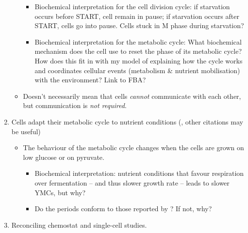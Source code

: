 \begin{enumerate}
\begin{itemize}
\begin{itemize}
\item Biochemical interpretation for the cell division cycle: if starvation occurs before START, cell remain in pause; if starvation occurs after START, cells go into pause.  Cells stuck in M phase during starvation?
\item Biochemical interpretation for the metabolic cycle: What biochemical mechanism does the cell use to reset the phase of its metabolic cycle?  How does this fit in with my model of explaining how the cycle works and coordinates cellular events (metabolism \& nutrient mobilisation) with the environment?  Link to FBA?
\end{itemize}
\item Doesn't necessarily mean that cells \emph{cannot} communicate with each other, but communication is \emph{not required}.
\end{itemize}
\item Cells adapt their metabolic cycle to nutrient conditions (\textcite{papagiannakisAutonomousMetabolicOscillations2017}, other citations may be useful)
\begin{itemize}
\item The behaviour of the metabolic cycle changes when the cells are grown on low glucose or on pyruvate.
\begin{itemize}
\item Biochemical interpretation: nutrient conditions that favour respiration over fermentation -- and thus slower growth rate -- leads to slower YMCs, but why?
\item Do the periods conform to those reported by \textcite{papagiannakisAutonomousMetabolicOscillations2017}?  If not, why?
\end{itemize}
\end{itemize}
\item Reconciling chemostat and single-cell studies.


\end{enumerate}
